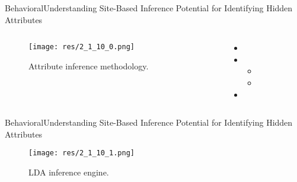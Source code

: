 \begin{frame}{Behavioral}{Understanding Site-Based Inference Potential for Identifying Hidden Attributes \cite{moore_understanding_2013}}

	\begin{columns}
		\begin{column}{0.5\textwidth}
			\begin{center}
			
				\begin{figure}
					\texttt{[image: res/2\_1\_10\_0.png]}
					\caption{\label{fig:2_1_10_0}Attribute inference methodology.}
				\end{figure}
				
			\end{center}
		\end{column}
		
		\begin{column}{0.5\textwidth}
		
			\begin{itemize}
				\item 
				
				\item 
					\begin{itemize}
						\item 
						\item 
					\end{itemize}
				
				\item 
			\end{itemize}
			
		\end{column}
	\end{columns}
	

\end{frame}

\begin{frame}[noframenumbering]{Behavioral}{Understanding Site-Based Inference Potential for Identifying Hidden Attributes \cite{moore_understanding_2013}}
			
				\begin{figure}
					\texttt{[image: res/2\_1\_10\_1.png]}
					\caption{\label{fig:2_1_10_1}LDA inference engine.}
				\end{figure}
	
\end{frame}

